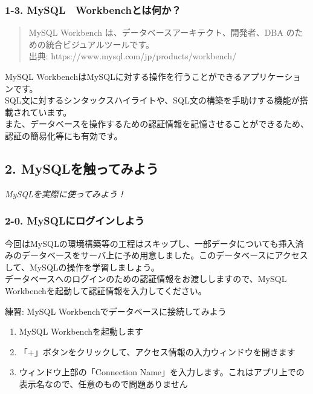 \subsubsection{1-3.
MySQL　Workbenchとは何か？}\label{mysql-workbenchux3068ux306fux4f55ux304b}

\begin{quote}
MySQL Workbench は、データベースアーキテクト、開発者、DBA
のための統合ビジュアルツールです。\\
出典: https://www.mysql.com/jp/products/workbench/
\end{quote}

MySQL
WorkbenchはMySQLに対する操作を行うことができるアプリケーションです。\\
SQL文に対するシンタックスハイライトや、SQL文の構築を手助けする機能が搭載されています。\\
また、データベースを操作するための認証情報を記憶させることができるため、認証の簡易化等にも有効です。

\subsection{2.
MySQLを触ってみよう}\label{mysqlux3092ux89e6ux3063ux3066ux307fux3088ux3046}

\emph{MySQLを実際に使ってみよう！}

\subsubsection{2-0.
MySQLにログインしよう}\label{mysqlux306bux30edux30b0ux30a4ux30f3ux3057ux3088ux3046}

今回はMySQLの環境構築等の工程はスキップし、一部データについても挿入済みのデータベースをサーバ上に予め用意しました。このデータベースにアクセスして、MySQLの操作を学習しましょう。\\
データベースへのログインのための認証情報をお渡ししますので、MySQL
Workbenchを起動して認証情報を入力してください。

練習: MySQL Workbenchでデータベースに接続してみよう

\begin{enumerate}
\def\labelenumi{\arabic{enumi}.}
\item
  MySQL Workbenchを起動します
\item
  「+」ボタンをクリックして、アクセス情報の入力ウィンドウを開きます
\item
  ウィンドウ上部の「Connection
  Name」を入力します。これはアプリ上での表示名なので、任意のもので問題ありません
\end{enumerate}

